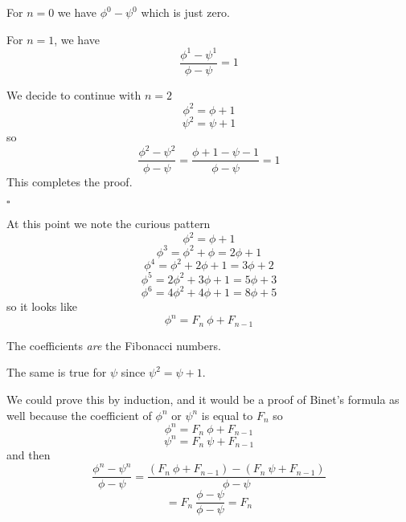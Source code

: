 \documentclass[11pt, oneside]{article}
\begin{document}
For $n = 0$ we have $\phi^0 - \psi^0$ which is just zero.

For $n = 1$, we have 
\[ \frac{\phi^1 - \psi^1}{\phi - \psi}  = 1 \]

We decide to continue with $n = 2$
\[ \phi^2 = \phi + 1 \]
\[ \psi^2 = \psi + 1 \]
so
\[ \frac{\phi^2 - \psi^2}{\phi - \psi} = \frac{\phi + 1 - \psi - 1}{\phi - \psi} = 1 \]
This completes the proof. 

$\square$

At this point we note the curious pattern
\[ \phi^2 = \phi + 1 \]
\[ \phi^3 = \phi^2 + \phi = 2 \phi + 1 \]
\[ \phi^4 = \phi^2 + 2 \phi + 1 = 3 \phi + 2 \]
\[ \phi^5 = 2 \phi^2 + 3 \phi + 1 =  5 \phi + 3 \] 
\[ \phi^6 = 4 \phi^2 + 4 \phi + 1 = 8 \phi + 5 \]
so it looks like
\[ \phi^n = F_n \ \phi + F_{n-1} \]

The coefficients \emph{are} the Fibonacci numbers.  

The same is true for $\psi$ since $\psi^2 = \psi + 1$.

We could prove this by induction, and it would be a proof of Binet's formula as well because the coefficient of $\phi^n$ or $\psi^n$ is equal to $F_n$ so
\[ \phi^n = F_n \ \phi + F_{n-1} \]
\[ \psi^n = F_n \ \psi + F_{n-1} \]
and then
\[ \frac{\phi^n - \psi^n}{\phi - \psi} = \frac{(F_n \ \phi + F_{n-1}) - (F_n \ \psi + F_{n-1})}{\phi - \psi} \]
\[ = F_n \ \frac{\phi - \psi}{\phi - \psi}  = F_n \]
\end{document}
